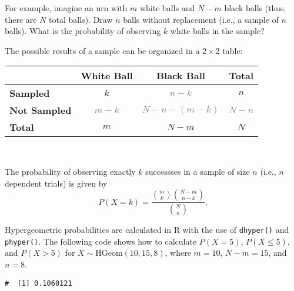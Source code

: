 \documentclass[letterpaper,12pt,twoside,]{pinp}
\begin{document}
For example, imagine an urn with \(m\) white balls and \(N - m\) black
balls (thus, there are \(N\) total balls). Draw \(n\) balls without
replacement (i.e., a sample of \(n\) balls). What is the probability of
observing \(k\) white balls in the sample?

The possible results of a sample can be organized in a \(2 \times 2\)
table:

\begin{table*}[h!]
\begin{center}
\begin{tabular}{l|cc|c} 
   & \textbf{White Ball} & \textbf{Black Ball} & \textbf{Total}\\ \hline
  \textbf{Sampled} & $k$ & \textcolor{gray}{$n - k$}  & $n$  \\
  \textbf{Not Sampled} & \textcolor{gray}{$m - k$} & \textcolor{gray}{$N - n - (m - k)$} & \textcolor{gray}{$N - n$} \\ \hline
  \textbf{Total} & $m$ & $N - m$ & $N$  \\ 
\end{tabular}\\
\end{center}
\end{table*}

The probability of observing exactly \(k\) successses in a sample of
size \(n\) (i.e., \(n\) dependent trials) is given by
\[P(X = k) = \dfrac{{m \choose k} {N - m \choose n-k}}{{N \choose n}}. \]

Hypergeometric probabilities are calculated in \textsf{R} with the use
of \texttt{dhyper()} and \texttt{phyper()}. The following code shows how
to calculate \(P(X = 5)\), \(P(X \leq 5)\), and \(P(X > 5)\) for
\(X \sim \text{HGeom}(10, 15, 8)\), where \(m = 10\), \(N - m = 15\),
and \(n = 8\).

\begin{Shaded}
\begin{Highlighting}[]
\NormalTok{(}\NormalTok{, }\NormalTok{, }\NormalTok{, }\NormalTok{)}
\end{Highlighting}
\end{Shaded}

\begin{ShadedResult}
\begin{verbatim}
#  [1] 0.1060121
\end{verbatim}
\end{ShadedResult}
\end{document}
